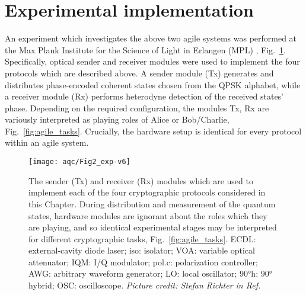 \section{Experimental implementation}\label{sec:aqc_experiment}

An experiment which investigates the above two agile systems was performed at the Max Plank Institute for the Science of Light in Erlangen (MPL) \cite{Richter2020}, Fig.~\ref{fig:aqc_experiment}. Specifically, optical sender  and receiver modules were used to implement the four protocols which are described above. A sender module (Tx) generates and distributes phase-encoded coherent states chosen from the QPSK alphabet, while a receiver module (Rx) performs heterodyne detection of the received states' phase. Depending on the required configuration, the modules Tx, Rx are variously interpreted as playing roles of Alice or Bob/Charlie, Fig.~\ref{fig:agile_tasks}. Crucially, the hardware setup is identical for every protocol within an agile system.

\begin{figure}[htp]
\captionsetup{width=0.8\linewidth}
\centering
\texttt{[image: aqc/Fig2\_exp-v6]}
\caption{\label{fig:aqc_experiment} The sender (Tx) and receiver (Rx) modules which are used to implement each of the four cryptographic protocols considered in this Chapter. During distribution and measurement of the quantum states, hardware modules are ignorant about the roles which they are playing, and so identical experimental stages may be interpreted for different cryptographic tasks, Fig.~\ref{fig:agile_tasks}. ECDL: external-cavity diode laser; iso: isolator; VOA: variable optical attenuator; IQM: I/Q modulator; pol.c: polarization controller; AWG: arbitrary waveform generator; LO: local oscillator; $90\si{\degree}$h: $90\si{\degree}$ hybrid; OSC: oscilloscope. \emph{Picture credit: Stefan Richter in Ref.~\cite{Richter2020}}}
\end{figure}


